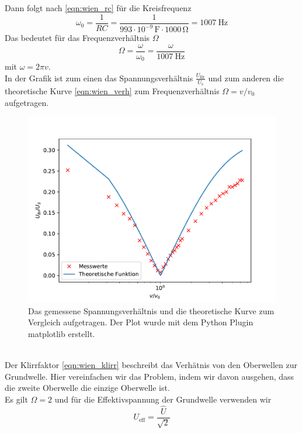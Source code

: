 Dann folgt nach \eqref{eqn:wien_rc} für die Kreisfrequenz
\begin{equation*}
  \omega_0 = \frac{1}{RC} = \frac{1}{993 \cdot 10^{-9}\, \si{\farad} \cdot 1000\, \si{\ohm}} = \SI{1007}{\hertz} 
\end{equation*}
Das bedeutet für das Frequenzverhältnis $\Omega$
\begin{equation*}
  \Omega = \frac{\omega}{\omega_0} = \frac{\omega}{\SI{1007}{\hertz}}
\end{equation*}
mit $\omega=2\pi v$.\\
In der Grafik ist zum einen das Spannungsverhältnis $\frac{U_\text{Br}}{U_\text{s}}$
und zum anderen die theoretische Kurve \eqref{eqn:wien_verh} zum Frequenzverhältnis $\Omega = v/v_0$ aufgetragen.
\begin{figure}
  \centering
  \includegraphics[width=\textwidth]{content/plot_e.pdf}
  \caption{Das gemessene Spannungsverhältnis und die theoretische Kurve zum Vergleich aufgetragen. Der Plot wurde mit dem Python Plugin matplotlib \cite{matplotlib} erstellt.}
  \label{fig:plot}
\end{figure}
\\
Der Klirrfaktor \eqref{eqn:wien_klirr} beschreibt das Verhätnis von den
Oberwellen zur Grundwelle. Hier vereinfachen wir das Problem, indem wir davon ausgehen, dass
die zweite Oberwelle die einzige Oberwelle ist.\\
Es gilt $\Omega = 2$ und für die Effektivspannung der Grundwelle verwenden wir
\begin{equation*}
  U_\text{eff} = \frac{\hat{U}}{\sqrt{2}}
\end{equation*}
